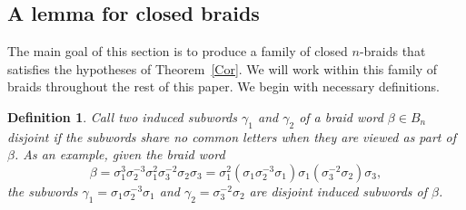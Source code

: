 \documentclass{article}
\newtheorem{definition}{Definition}[section]
\begin{document}
%
%
%
















\subsection{A lemma for closed braids} 

The main goal of this section is to produce a family of closed $n$-braids that satisfies the hypotheses of Theorem~\ref{Cor}. We will work within this family of braids throughout the rest of this paper. We begin with necessary definitions.  

\begin{definition}
Call two induced subwords $\gamma_{1}$ and $\gamma_{2}$ of a braid word $\beta \in B_{n}$ \emph{disjoint} if the subwords share no common letters when they are viewed as part of $\beta$. As an example, given the braid word
$$\beta=\sigma_{1}^{3}\sigma_{2}^{-3}\sigma_{1}^{2}\sigma_{3}^{-2}\sigma_{2}\sigma_{3}=\sigma_{1}^{2}(\sigma_{1}\sigma_{2}^{-3}\sigma_{1})\sigma_{1}(\sigma_{3}^{-2}\sigma_{2})\sigma_{3},$$ 
\noindent the subwords $\gamma_{1}=\sigma_{1}\sigma_{2}^{-3}\sigma_{1}$ and $\gamma_{2}=\sigma_{3}^{-2}\sigma_{2}$ are disjoint induced subwords of $\beta$. 
\end{definition}
\end{document}
